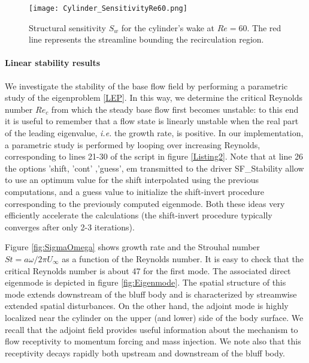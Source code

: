 \documentclass[twocolumn,10pt]{asme2ej}
\begin{document}
\begin{figure}
\texttt{[image: Cylinder\_SensitivityRe60.png]}
\caption{ Structural sensitivity $S_w$ for the cylinder's wake at $Re= 60$. The red line represents the streamline bounding the recirculation region.}
\label{fig:StructEndo}
\end{figure}




\paragraph{Linear stability results}

We investigate the stability of the base flow field by performing a parametric study of the eigenproblem \eqref{LEP}. In this way, we determine the critical Reynolds number $Re_c$ from which the steady base flow first becomes unstable: to this end it is useful to remember that a flow state is linearly unstable when the real part of  the leading eigenvalue, \textit{i.e.} the growth rate, is positive. In our implementation, a parametric study is performed by looping over increasing Reynolds, corresponding to lines 21-30 of the script in figure \ref{Listing2}. Note that at line 26 the options {\sf  'shift, 'cont' ,'guess', em} transmitted to the driver {\sf  SF\_Stability} allow to use an optimum value for the shift interpolated using the previous computations, and a guess value to initialize the shift-invert procedure corresponding to the previously computed eigenmode. Both these ideas very efficiently accelerate the calculations (the shift-invert procedure typically converges after only 2-3 iterations).

Figure \ref{fig:SigmaOmega} shows growth rate and the Strouhal number $St=a\omega/2 \pi U_{\infty}$ as a function of the Reynolds number.
It is easy to check that the critical Reynolds number is about 47 for the first mode.
The associated direct eigenmode is depicted in figure \ref{fig:Eigenmode}.
The spatial structure of this mode extends downstream of the bluff body and is characterized by streamwise extended spatial disturbances.
On the other hand, the adjoint mode is highly localized near the cylinder on the upper (and lower) side of the body surface.
We recall that the adjoint field provides useful information about the mechanism to flow receptivity to momentum forcing and mass injection.
We note also that this receptivity decays rapidly both upstream and downstream of the bluff body.
\end{document}
